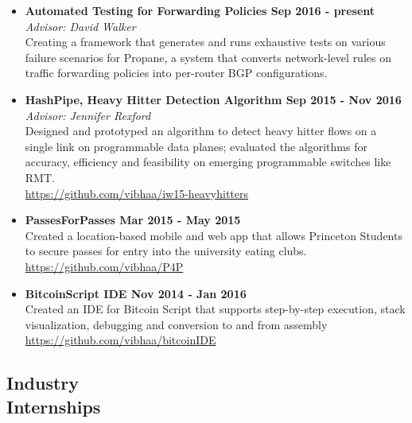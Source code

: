 \documentclass[margin]{res}
\begin{document}
\begin{resume}
\begin{itemize}
\end{itemize}
\begin{itemize} \itemsep -2pt  %
\section{Projects}
\item 
{\bf Automated Testing for Forwarding Policies \hfill  Sep 2016  - present} \\
\emph{Advisor: David Walker}\\
Creating a framework that generates and runs exhaustive tests on various failure scenarios for Propane, a system that converts network-level rules on traffic forwarding policies into per-router BGP configurations.

\item
{\bf HashPipe, Heavy Hitter Detection Algorithm  \hfill Sep 2015 - Nov 2016} \\
\emph{Advisor: Jennifer Rexford}\\
Designed and prototyped an algorithm to detect heavy hitter flows on a single link on programmable data planes; evaluated the algorithms for accuracy, efficiency and feasibility on emerging programmable switches like RMT.\\
\url{https://github.com/vibhaa/iw15-heavyhitters}

\item
{\bf PassesForPasses \hfill Mar 2015 - May 2015 }\\
Created a location-based mobile and web app that allows Princeton Students to secure passes for entry into the university eating clubs. \\
\url{https://github.com/vibhaa/P4P}

 \item
{\bf BitcoinScript IDE \hfill Nov 2014 - Jan 2016 }\\
Created an IDE for Bitcoin Script that supports step-by-step execution, stack visualization, debugging and conversion to and from assembly \\ \url{https://github.com/vibhaa/bitcoinIDE}   
\end{itemize}

\begin{itemize}
\section{Industry \\Internships}


\end{itemize}
\end{resume}
\end{document}

